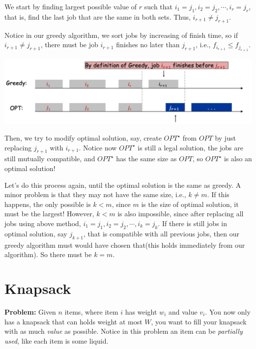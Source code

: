 \begin{spacing}{1.3}
    We start by finding largest possible value of $r$ such that $i_1=j_1, i_2=j_2, \cdots, i_r=j_r$,
    that is, find the last job that are the same in both sets. Thus, $i_{r+1}\ne j_{r+1}$.

    Notice in our greedy algorithm, we sort jobs by increasing of finish time, so if $i_{r+1}\ne j_{r+1}$,
    there must be job $i_{r+1}$ finishes no later than $j_{r+1}$, i.e., $f_{i_{r+1}}\le f_{j_{r+1}}$.
    \begin{center}
        \includegraphics[scale=0.35]{images/07-interval-proof.png}
    \end{center}
    Then, we try to modify optimal solution, say, create $OPT^\star$ from $OPT$ by just replacing 
    $j_{r+1}$ with $i_{r+1}$. Notice now $OPT^\star$ is still a legal solution, the jobs are
    still mutually compatible, and $OPT^\star$ has the same size as $OPT$, so $OPT^\star$ is 
    also an optimal solution!

    Let's do this process again, until the optimal solution is the same as greedy.
    A minor problem is that they may not have the same size, i.e., $k\ne m$. 
    If this happens, the only possible is $k<m$, since $m$ is the size of optimal solution, 
    it must be the largest! However, $k<m$ is also impossible, since after replacing 
    all jobs using above method, $i_1=j_1, i_2=j_2,\cdots, i_k=j_k$. If there is 
    still jobs in optimal solution, say $j_{k+1}$, that is compatible with all previous 
    jobs, then our greedy algorithm must would have chosen that(this holds immediately 
    from our algorithm). So there must be $k=m$.


    \vspace{0.5in}
    \section{Knapsack}

    {\bf Problem:} Given $n$ items, where item $i$ has weight $w_i$ and value $v_i$.
    You now only has a knapsack that can holds weight at most $W$, you want to fill 
    your knapsack with as much {\it value} as possible. Notice in this problem an item 
    can be {\it partially used}, like each item is some liquid.


\end{spacing}
